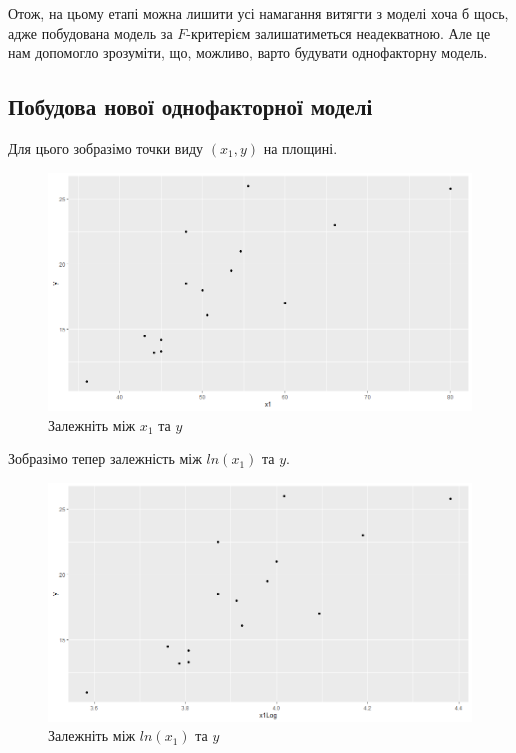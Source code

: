 \documentclass[14pt,a4paper]{scrartcl}
\theoremstyle{definition}
\theoremstyle{remark}
\theoremstyle{definition}
\theoremstyle{definition}
\begin{document}
Отож, на цьому етапі можна лишити усі намагання витягти з моделі хоча б щось, адже побудована модель за $F$-критерієм залишатиметься неадекватною. Але це нам допомогло зрозуміти, що, можливо, варто будувати однофакторну модель.

\subsection{Побудова нової однофакторної моделі}

Для цього зобразімо точки виду $(x_{1}, y)$ на площині.

\begin{figure}[H]
  \includegraphics[width=\linewidth]{Plot_x1_y.png}
  \caption{Залежніть між $x_{1}$ та $y$}
  \label{fig:image5}
\end{figure}

Зобразімо тепер залежність між $ln(x_{1})$ та $y$.

\begin{figure}[H]
  \includegraphics[width=\linewidth]{Plot_x1Log_y.png}
  \caption{Залежніть між $ln(x_{1})$ та $y$}
  \label{fig:image6}
\end{figure}
\end{document}
